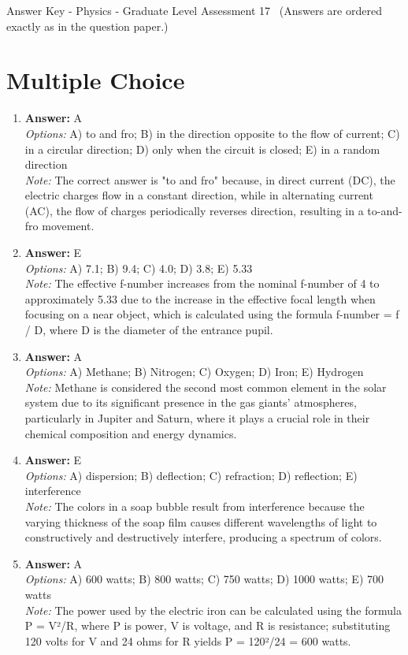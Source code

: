 \documentclass[12pt]{article}
\begin{document}
\begin{center}
Answer Key - Physics - Graduate Level Assessment 17 \
\small (Answers are ordered exactly as in the question paper.)
\end{center}

\section*{Multiple Choice}
\begin{enumerate}[label=\arabic*.]
\item \textbf{Answer:} A
\\ \textit{Options:} A) to and fro; B) in the direction opposite to the flow of current; C) in a circular direction; D) only when the circuit is closed; E) in a random direction
\\ \textit{Note:} The correct answer is "to and fro" because, in direct current (DC), the electric charges flow in a constant direction, while in alternating current (AC), the flow of charges periodically reverses direction, resulting in a to-and-fro movement.
\item \textbf{Answer:} E
\\ \textit{Options:} A) 7.1; B) 9.4; C) 4.0; D) 3.8; E) 5.33
\\ \textit{Note:} The effective f-number increases from the nominal f-number of 4 to approximately 5.33 due to the increase in the effective focal length when focusing on a near object, which is calculated using the formula f-number = f / D, where D is the diameter of the entrance pupil.
\item \textbf{Answer:} A
\\ \textit{Options:} A) Methane; B) Nitrogen; C) Oxygen; D) Iron; E) Hydrogen
\\ \textit{Note:} Methane is considered the second most common element in the solar system due to its significant presence in the gas giants' atmospheres, particularly in Jupiter and Saturn, where it plays a crucial role in their chemical composition and energy dynamics.
\item \textbf{Answer:} E
\\ \textit{Options:} A) dispersion; B) deflection; C) refraction; D) reflection; E) interference
\\ \textit{Note:} The colors in a soap bubble result from interference because the varying thickness of the soap film causes different wavelengths of light to constructively and destructively interfere, producing a spectrum of colors.
\item \textbf{Answer:} A
\\ \textit{Options:} A) 600 watts; B) 800 watts; C) 750 watts; D) 1000 watts; E) 700 watts
\\ \textit{Note:} The power used by the electric iron can be calculated using the formula P = V²/R, where P is power, V is voltage, and R is resistance; substituting 120 volts for V and 24 ohms for R yields P = 120²/24 = 600 watts.
\end{enumerate}
\end{document}
